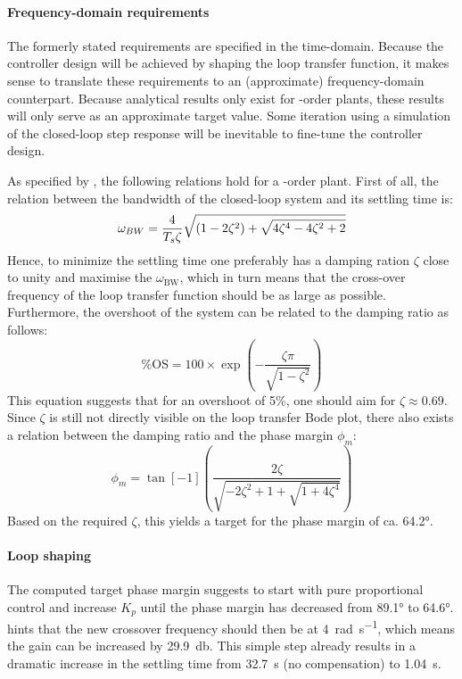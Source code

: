 \paragraph{Frequency-domain requirements}
The formerly stated requirements are specified in the time-domain. Because the controller design will be achieved by shaping the loop transfer function, it makes sense to translate these requirements to an (approximate) frequency-domain counterpart. Because analytical results only exist for -order plants, these results will only serve as an approximate target value. Some iteration using a simulation of the closed-loop step response will be inevitable to fine-tune the controller design.

As specified by \textcite{nise}, the following relations hold for a -order plant. First of all, the relation between the bandwidth of the closed-loop system and its settling time is:
\begin{equation}
    \omega_{BW} = \frac{4}{T_s\zeta}\sqrt{\qty(1 - 2\zeta^2)+\sqrt{4
    \zeta^4-4\zeta^2+2}}
    \label{eq:damping}
\end{equation}
Hence, to minimize the settling time one preferably has a damping ration $\zeta$ close to unity and maximise the $\omega_\text{BW}$, which in turn means that the cross-over frequency of the loop transfer function should be as large as possible. Furthermore, the overshoot of the system can be related to the damping ratio as follows:
\begin{equation}
\%\text{OS} = 100\times \exp(-\frac{\zeta \pi}{\sqrt{1-\zeta^2}})
\label{eq:overshoot}    
\end{equation}
This equation suggests that for an overshoot of 5\%, one should aim for $\zeta \approx 0.69$.
Since $\zeta$ is still not directly visible on the loop transfer Bode plot, there also exists a relation between the damping ratio and the phase margin $\phi_m$:
\begin{equation}
\phi_m = \tan[-1](\frac{2\zeta}{\sqrt{-2\zeta^2 + 1 + \sqrt{1 + 4\zeta^4}}})
\label{eq:settlingtime}    
\end{equation}
Based on the required $\zeta$, this yields a target for the phase margin of ca. \ang{64.2}.

\paragraph{Loop shaping}
The computed target phase margin suggests to start with pure proportional control and increase $K_p$ until the phase margin has decreased from \ang{89.1} to \ang{64.6}.  hints that the new crossover frequency should then be at \SI{4}{\radian\per\second}, which means the gain can be increased by \SI{29.9}{\decibel}. This simple step already results in a dramatic increase in the settling time from \SI{32.7}{\second} (no compensation) to \SI{1.04}{\second}. 

